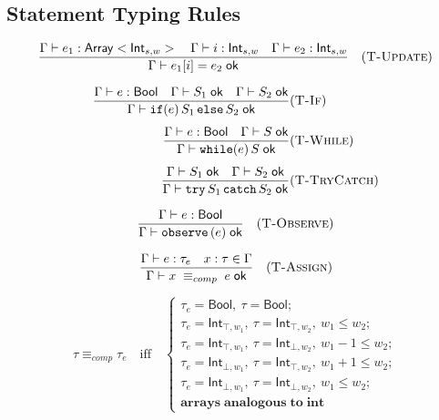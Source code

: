 \subsection*{Statement Typing Rules}

\[
  \frac{\Gamma\vdash e_1 : \mathsf{Array}<\mathsf{Int}_{s,w}>
  \quad
  \Gamma\vdash i    : \mathsf{Int}_{s,w}
  \quad
  \Gamma\vdash e_2  : \mathsf{Int}_{s,w}}
  {\Gamma\vdash e_1[i] = e_2 \;\mathsf{ok}}
  \quad(\textsc{T-Update})
\]

\begin{multicols}{2}
  \[
    \begin{aligned}
      \frac{\Gamma \vdash e : \mathsf{Bool}
        \quad
        \Gamma \vdash S_1\;\mathsf{ok}
        \quad
        \Gamma \vdash S_2\;\mathsf{ok}}
      {\Gamma \vdash \mathtt{if}(e)\,S_1\,\mathtt{else}\,S_2\;\mathsf{ok}}
       & (\textsc{T-If})       \\[1ex]
      \frac{\Gamma \vdash e : \mathsf{Bool}
        \quad
        \Gamma \vdash S\;\mathsf{ok}}
      {\Gamma \vdash \mathtt{while}(e)\,S\;\mathsf{ok}}
       & (\textsc{T-While})    \\[1ex]
      \frac{\Gamma \vdash S_1\;\mathsf{ok}
        \quad
        \Gamma \vdash S_2\;\mathsf{ok}}
      {\Gamma \vdash \mathtt{try}\,S_1\,\mathtt{catch}\,S_2\;\mathsf{ok}}
       & (\textsc{T-TryCatch})
    \end{aligned}
  \]

  \[
    \frac{\Gamma \vdash e : \mathsf{Bool}}
    {\Gamma \vdash \mathtt{observe}\,(e)\;\mathsf{ok}}
    \quad(\textsc{T-Observe})
  \]

  \[
    \frac{\Gamma \vdash e : \tau_e
      \quad
      x:\tau \in \Gamma}
    {\Gamma \vdash x \;\equiv_{comp}\; e\;\mathsf{ok}}
    \quad(\textsc{T-Assign})
  \]
\end{multicols}


\[
  \tau \equiv_{comp} \tau_e\quad\text{iff}\quad
  \begin{cases}
    \tau_e = \mathsf{Bool},\ \tau = \mathsf{Bool};                                       \\[4pt]
    \tau_e = \mathsf{Int}_{\top,w_1},\ \tau = \mathsf{Int}_{\top,w_2},\ w_1 \le w_2;     \\[4pt]
    \tau_e = \mathsf{Int}_{\top,w_1},\ \tau = \mathsf{Int}_{\bot,w_2},\ w_1 - 1 \le w_2; \\[4pt]
    \tau_e = \mathsf{Int}_{\bot,w_1},\ \tau = \mathsf{Int}_{\top,w_2},\ w_1 + 1 \le w_2; \\[4pt]
    \tau_e = \mathsf{Int}_{\bot,w_1},\ \tau = \mathsf{Int}_{\bot,w_2},\ w_1 \le w_2;     \\[4pt]
    \mathbf{arrays\;analogous\;to\;int}
  \end{cases}
\]



